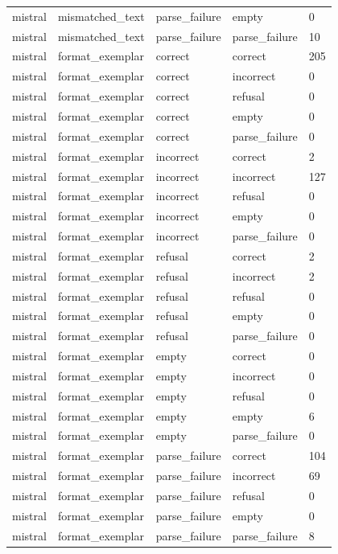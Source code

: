 \begin{tabular}{lllll}
mistral & mismatched\_text & parse\_failure & empty & 0 \\
mistral & mismatched\_text & parse\_failure & parse\_failure & 10 \\
mistral & format\_exemplar & correct & correct & 205 \\
mistral & format\_exemplar & correct & incorrect & 0 \\
mistral & format\_exemplar & correct & refusal & 0 \\
mistral & format\_exemplar & correct & empty & 0 \\
mistral & format\_exemplar & correct & parse\_failure & 0 \\
mistral & format\_exemplar & incorrect & correct & 2 \\
mistral & format\_exemplar & incorrect & incorrect & 127 \\
mistral & format\_exemplar & incorrect & refusal & 0 \\
mistral & format\_exemplar & incorrect & empty & 0 \\
mistral & format\_exemplar & incorrect & parse\_failure & 0 \\
mistral & format\_exemplar & refusal & correct & 2 \\
mistral & format\_exemplar & refusal & incorrect & 2 \\
mistral & format\_exemplar & refusal & refusal & 0 \\
mistral & format\_exemplar & refusal & empty & 0 \\
mistral & format\_exemplar & refusal & parse\_failure & 0 \\
mistral & format\_exemplar & empty & correct & 0 \\
mistral & format\_exemplar & empty & incorrect & 0 \\
mistral & format\_exemplar & empty & refusal & 0 \\
mistral & format\_exemplar & empty & empty & 6 \\
mistral & format\_exemplar & empty & parse\_failure & 0 \\
mistral & format\_exemplar & parse\_failure & correct & 104 \\
mistral & format\_exemplar & parse\_failure & incorrect & 69 \\
mistral & format\_exemplar & parse\_failure & refusal & 0 \\
mistral & format\_exemplar & parse\_failure & empty & 0 \\
mistral & format\_exemplar & parse\_failure & parse\_failure & 8 \\

\end{tabular}
